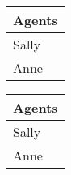 \begin{tabular}{l}
\toprule
Agents \\
\midrule
 Sally \\
  Anne \\
\bottomrule
\end{tabular}

\begin{tabular}{l}
\toprule
Agents \\
\midrule
 Sally \\
  Anne \\
\bottomrule
\end{tabular}

